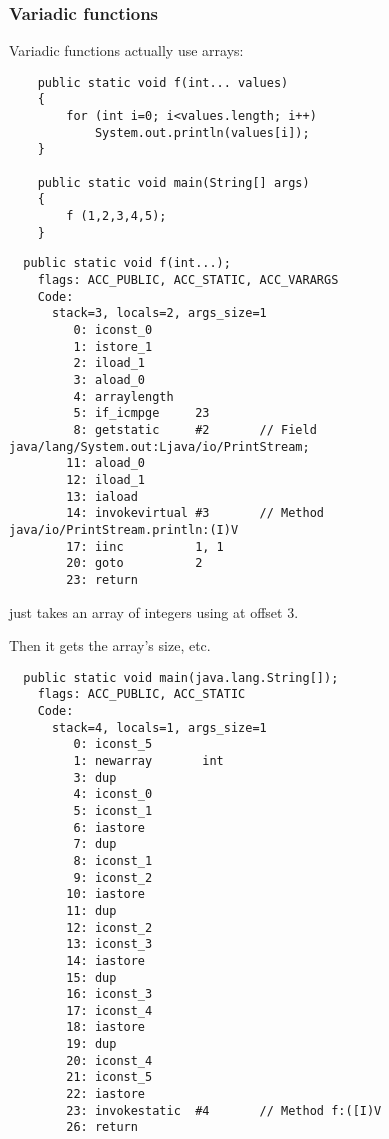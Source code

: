 \subsubsection{Variadic functions}

Variadic functions actually use arrays:


\begin{lstlisting}
	public static void f(int... values)
	{
		for (int i=0; i<values.length; i++)
			System.out.println(values[i]);
	}

	public static void main(String[] args) 
	{
		f (1,2,3,4,5);
	}
\end{lstlisting}

\begin{lstlisting}
  public static void f(int...);
    flags: ACC_PUBLIC, ACC_STATIC, ACC_VARARGS
    Code:
      stack=3, locals=2, args_size=1
         0: iconst_0      
         1: istore_1      
         2: iload_1       
         3: aload_0       
         4: arraylength   
         5: if_icmpge     23
         8: getstatic     #2       // Field java/lang/System.out:Ljava/io/PrintStream;
        11: aload_0       
        12: iload_1       
        13: iaload        
        14: invokevirtual #3       // Method java/io/PrintStream.println:(I)V
        17: iinc          1, 1
        20: goto          2
        23: return        
\end{lstlisting}

\ttf just takes an array of integers using  at offset 3.

Then it gets the array's size, etc.


\begin{lstlisting}
  public static void main(java.lang.String[]);
    flags: ACC_PUBLIC, ACC_STATIC
    Code:
      stack=4, locals=1, args_size=1
         0: iconst_5      
         1: newarray       int
         3: dup           
         4: iconst_0      
         5: iconst_1      
         6: iastore       
         7: dup           
         8: iconst_1      
         9: iconst_2      
        10: iastore       
        11: dup           
        12: iconst_2      
        13: iconst_3      
        14: iastore       
        15: dup           
        16: iconst_3      
        17: iconst_4      
        18: iastore       
        19: dup           
        20: iconst_4      
        21: iconst_5      
        22: iastore       
        23: invokestatic  #4       // Method f:([I)V
        26: return        
\end{lstlisting}


